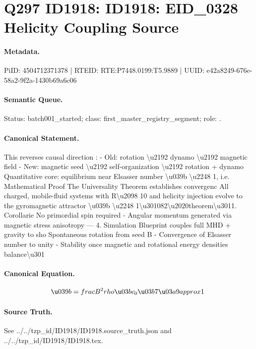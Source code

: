 \section*{Q297 ID1918: ID1918: EID\_0328 Helicity Coupling Source}
\paragraph{Metadata.}
PiID: 4504712371378 | RTEID: RTE:P7448.0199:T5.9889 | UUID: e42a8249-676e-58a2-9f2a-1430b69a6c06

\paragraph{Semantic Queue.}
Status: batch001\_started; class: first\_master\_registry\_segment; role: .

\paragraph{Canonical Statement.}
This reverses causal direction : - Old: rotation \textbackslash{}u2192 dynamo \textbackslash{}u2192 magnetic field - New: magnetic seed \textbackslash{}u2192 self-organization \textbackslash{}u2192 rotation + dynamo Quantitative core: equilibrium near Elsasser number \textbackslash{}u039b \textbackslash{}u2248 1, i.e. Mathematical Proof The Universality Theorem establishes convergenc All charged, mobile-fluid systems with R\textbackslash{}u2098 10 and helicity injection evolve to the gyromagnetic attractor \textbackslash{}u039b \textbackslash{}u2248 1\textbackslash{}u301082\textbackslash{}u2020theorem\textbackslash{}u3011. Corollarie No primordial spin required - Angular momentum generated via magnetic stress anisotropy --- 4. Simulation Blueprint couples full MHD + gravity to sho Spontaneous rotation from seed B - Convergence of Elsasser number to unity - Stability once magnetic and rotational energy densities balance\textbackslash{}u301

\paragraph{Canonical Equation.}
\[
\u039b = \\frac{B^2}{\\rho \u03bc_0 \u03b7 \u03a9} \\approx 1 \
\]

\paragraph{Source Truth.}
See ../../tzp\_id/ID1918/ID1918.source\_truth.json and ../../tzp\_id/ID1918/ID1918.tex.

